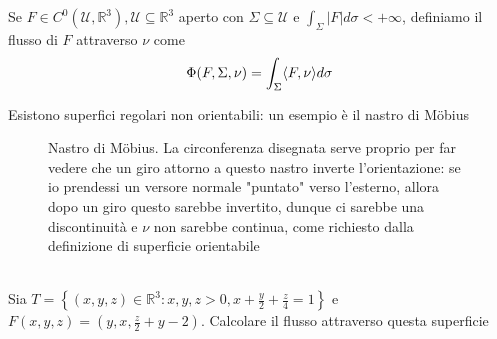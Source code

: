 \begin{definition}
	Se $F \in C^0(\mathcal{U}, \mathbb{R}^3), \mathcal{U} \subseteq \mathbb{R}^3$ aperto con $\Sigma \subseteq \mathcal{U}$ e $\int_\Sigma |F|d\sigma < +\infty$, definiamo il flusso di $F$ attraverso $\nu$ come
	$$
	\Phi(F, \Sigma, \nu) = \int_\Sigma \langle F, \nu \rangle d\sigma
	$$
\end{definition}
\begin{remark}
	Esistono superfici regolari non orientabili: un esempio è il nastro di Möbius
	\begin{figure}[H]
		\centering
		  \caption{Nastro di Möbius. La circonferenza disegnata serve proprio per far vedere che un giro attorno a questo nastro inverte l'orientazione: se io prendessi un versore normale "puntato" verso l'esterno, allora dopo un giro questo sarebbe invertito, dunque ci sarebbe una discontinuità e $\nu$ non sarebbe continua,
		  come richiesto dalla definizione di superficie orientabile}
	\end{figure}
\end{remark}
\begin{example} \hspace{1cm} \\
	Sia $T=\left\{(x, y, z) \in \mathbb{R}^3: x, y, z > 0, x + \frac{y}{2}+\frac{z}{4}=1 \right\}$ e $F(x, y, z)=(y, x, \frac{z}{2}+ y - 2)$. Calcolare il flusso attraverso questa superficie
\end{example}
